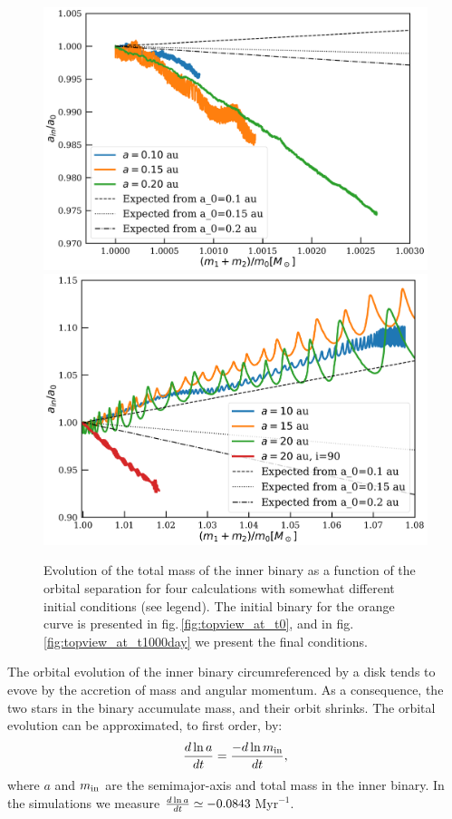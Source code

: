 \documentclass{aastex62}
\begin{document}
\begin{figure}[ht!]
  \includegraphics[width=\columnwidth]{fig_orbital_evolution_for_12MSun.pdf}
  \includegraphics[width=\columnwidth]{fig_orbital_evolution_for_14MSun.pdf}
  \caption{Evolution of the total mass of the inner binary as a
    function of the orbital separation for four calculations with
    somewhat different initial conditions (see legend).  The initial
    binary for the orange curve is presented in
    fig.\,\ref{fig:topview_at_t0}, and in
    fig.\,\ref{fig:topview_at_t1000day} we present the final
    conditions.
\label{fig:mass_vs_semimajor_axis}}
\end{figure}

The orbital evolution of the inner binary circumreferenced by a disk
tends to evove by the accretion of mass and angular momentum. As a
consequence, the two stars in the binary accumulate mass, and their
orbit shrinks. The orbital evolution can be approximated, to first order, by:
\begin{equation}
  {d\ln a \over dt}   = {-d\ln m_{\rm in} \over dt},
\end{equation}
where $a$ and $m_{\rm in}$ are the semimajor-axis and total mass in
the inner binary.  In the simulations we measure ${d\ln a \over dt}
\simeq -0.0843$\,Myr$^{-1}$.
\end{document}
